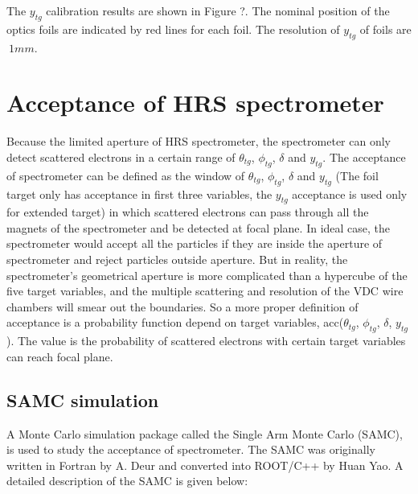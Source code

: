 The $y_{tg}$ calibration results are shown in Figure ?. The nominal position of the optics foils are
indicated by red lines for each foil. The resolution of $y_{tg}$ of foils are $~1 mm$.


\section{Acceptance of HRS spectrometer}

Because the limited aperture of HRS spectrometer, the spectrometer can only detect scattered electrons
in a certain range of $\theta_{tg}$, $\phi_{tg}$, $\delta$ and $y_{tg}$.
The acceptance of spectrometer can be defined as the window of $\theta_{tg}$, $\phi_{tg}$, $\delta$ and $y_{tg}$ (The foil target only has acceptance in first three variables, the $y_{tg}$ acceptance
is used only for extended target) in which scattered electrons can pass through all the magnets of the
spectrometer and  be detected at focal plane.
In ideal case, the spectrometer would accept all the particles if they are inside the aperture of
spectrometer and reject particles outside aperture.
But in reality, the spectrometer's geometrical aperture is more complicated than a hypercube of 
the five target variables, and the multiple scattering and resolution of the VDC wire chambers will smear
out the boundaries.
So a more proper definition of acceptance is a probability function depend on target variables,
acc($\theta_{tg}$, $\phi_{tg}$, $\delta$, $y_{tg}$). The value  is the 
probability of scattered electrons with certain target variables can reach focal plane.

\subsection{SAMC simulation}
A Monte Carlo simulation package called the Single Arm Monte Carlo (SAMC), is used to study 
the acceptance of spectrometer. The SAMC was originally written in Fortran by  A. Deur and converted
into ROOT/C++ by Huan Yao. A detailed description of the SAMC is given below:

